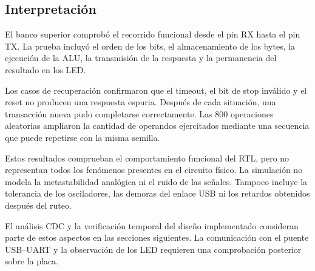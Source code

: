 \subsection{Interpretación}

El banco superior comprobó el recorrido funcional desde el pin RX
hasta el pin TX. La prueba incluyó el orden de los bits, el
almacenamiento de los bytes, la ejecución de la ALU, la transmisión
de la respuesta y la permanencia del resultado en los LED.

Los casos de recuperación confirmaron que el timeout, el bit de stop
inválido y el reset no producen una respuesta espuria. Después de
cada situación, una transacción nueva pudo completarse correctamente.
Las 800 operaciones aleatorias ampliaron la cantidad de operandos
ejercitados mediante una secuencia que puede repetirse con la misma semilla.

Estos resultados comprueban el comportamiento funcional del RTL, pero
no representan todos los fenómenos presentes en el circuito físico.
La simulación no modela la metastabilidad analógica ni el ruido de
las señales. Tampoco incluye la tolerancia de los osciladores, las
demoras del enlace USB ni los retardos obtenidos después del ruteo.

El análisis CDC y la verificación temporal del diseño implementado
consideran parte de estos aspectos en las secciones siguientes. La
comunicación con el puente USB--UART y la observación de los LED
requieren una comprobación posterior sobre la placa.
